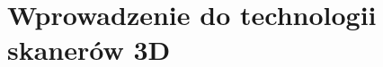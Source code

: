 
\begingroup
\let\clearpage\relax
\chapter{Wprowadzenie do technologii skanerów 3D}







\endgroup




